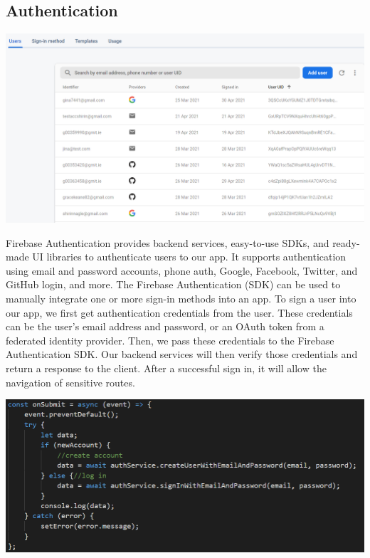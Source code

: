 \subsection{Authentication}

\begin{center}    
      \includegraphics[scale=0.4]{img/auth.PNG}
\end{center}

Firebase Authentication provides backend services, easy-to-use SDKs, and ready-made UI libraries to authenticate users to our app. 
It supports authentication using email and password accounts, phone auth, Google, Facebook, Twitter, and GitHub login, and more. The Firebase Authentication (SDK) can be used to manually integrate one or more sign-in methods into an app.
To sign a user into our app, we first get authentication credentials from the user. These credentials can be the user's email address and password, or an OAuth token from a federated identity provider. Then, we pass these credentials to the Firebase Authentication SDK. Our backend services will then verify those credentials and return a response to the client.
After a successful sign in, it will allow the navigation of sensitive routes.

\begin{center}    
      \includegraphics[scale=0.55]{img/login.PNG}
\end{center}


